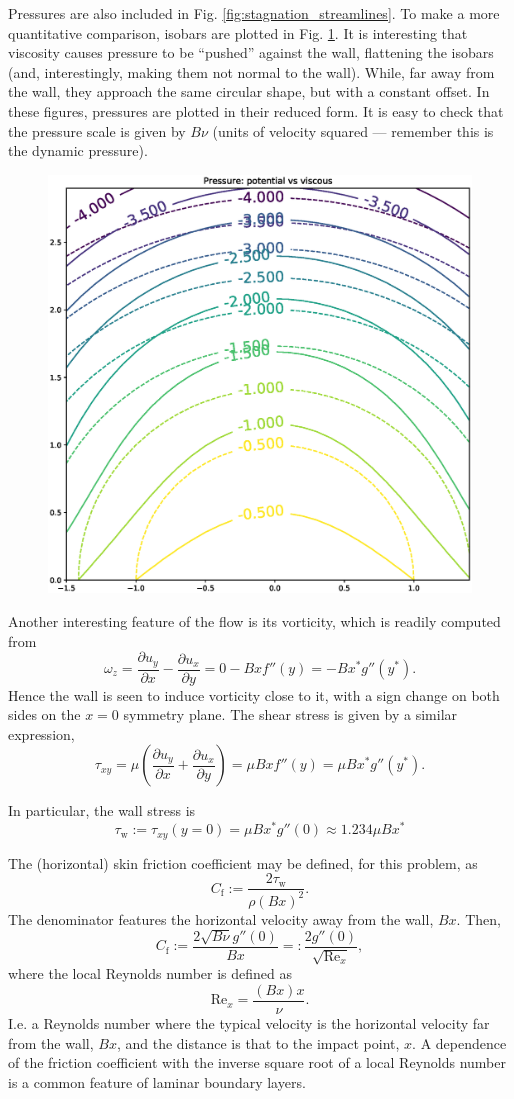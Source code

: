  Pressures are also included in Fig.
 \ref{fig:stagnation_streamlines}. To make a more quantitative
 comparison, isobars are plotted in
 Fig. \ref{fig:stagnation_pressures}. It is interesting that viscosity
 causes pressure to be ``pushed'' against the wall, flattening the
 isobars (and, interestingly, making them not normal to the
 wall). While, far away from the wall, they approach the same circular
 shape, but with a constant offset. In these figures, pressures are
 plotted in their reduced form. It is easy to check that the pressure
 scale is given by $B \nu$ (units of velocity squared --- remember this
 is the dynamic pressure).

\begin{figure}
  \centering
  \includegraphics[width=0.6\linewidth]{figures/stagnation_potential_viscous_pressures}
  \caption{\label{fig:stagnation_pressures}}
\end{figure}

Another interesting feature of the flow is its vorticity, which is
readily computed from
\[
\omega_z =
\frac{\partial u_y}{\partial x} -
\frac{\partial u_x}{\partial y} =
0 - B x f''(y)  = - B x^* g''(y^*) .
\]
Hence the wall is seen to induce vorticity close to it, with a sign change
on both sides on the $x=0$ symmetry plane. The shear stress is given by a
similar expression,
\[
\tau_{xy}= \mu
\left(
\frac{\partial u_y}{\partial x} +
\frac{\partial u_x}{\partial y}
\right)
 =  \mu B  x f''(y)  = \mu B x^* g''(y^*) .
 \]

 In particular, the wall stress is
 \[
 \tau_\mathrm{w}:=\tau_{xy}(y=0) = \mu B x^* g''(0)
 \approx 1.234 \mu B x^*
 \]

 The (horizontal) skin friction coefficient may be defined, for this problem,
 as
 \[
 C_\mathrm{f} := \frac{2 \tau_\mathrm{w} }{ \rho (B x)^2 } .
 \]
 The denominator features the horizontal velocity away from the wall,
 $B x$. Then,
 \[
 C_\mathrm{f} := \frac{2 \sqrt{B\nu}  g''(0) }{ B x } =:
 \frac{2   g''(0) }{\sqrt{ \mathrm{Re}_x} } ,
 \]
 where the local Reynolds number is defined as
 \[
 \mathrm{Re}_x = \frac{(Bx) x}{\nu} .
 \]
 I.e. a Reynolds number where the typical velocity is the horizontal
 velocity far from the wall, $Bx$, and the distance is that to the
 impact point, $x$. A dependence of the friction coefficient with the
 inverse square root of a local Reynolds number is a common feature of
 laminar boundary layers.
 
